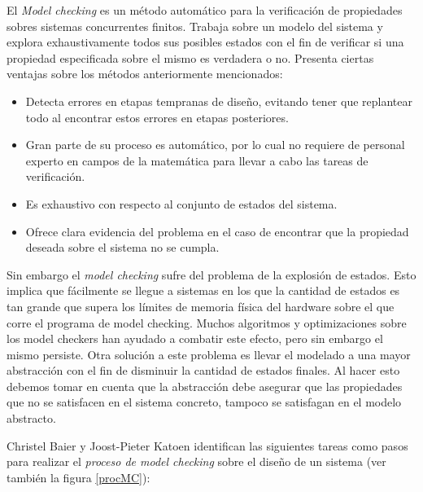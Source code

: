 \documentclass[titlepage, 12pt]{book}
\begin{document}
El \textit{Model checking} es un m\'etodo autom\'atico para la verificaci\'on de propiedades sobres sistemas concurrentes finitos. Trabaja sobre un modelo del sistema y explora exhaustivamente todos sus posibles estados con el fin de verificar si una propiedad especificada sobre el mismo es verdadera o no. Presenta ciertas ventajas sobre los m\'etodos anteriormente mencionados:

\begin{itemize}
\item Detecta errores en etapas tempranas de dise\~no, evitando tener que replantear todo al encontrar estos errores en etapas posteriores.

\item Gran parte de su proceso es autom\'atico, por lo cual no requiere de personal experto en campos de la matem\'atica para llevar a cabo las tareas de verificaci\'on.

\item Es exhaustivo con respecto al conjunto de estados del sistema.

\item Ofrece clara evidencia del problema en el caso de encontrar que la propiedad deseada sobre el sistema no se cumpla.
\end{itemize}

Sin embargo el \textit{model checking} sufre del problema de la explosi\'on de estados. Esto implica que f\'acilmente se llegue a sistemas en los que la cantidad de estados es tan grande que supera los l\'imites de memoria f\'isica del hardware sobre el que corre el programa de model checking. Muchos algoritmos y optimizaciones sobre los model checkers han ayudado a combatir este efecto, pero sin embargo el mismo persiste. Otra soluci\'on a este problema es llevar el modelado a una mayor abstracci\'on con el fin de disminuir la cantidad de estados finales. Al hacer esto debemos tomar en cuenta que la abstracci\'on debe asegurar que las propiedades que no se satisfacen en el sistema concreto, tampoco se satisfagan en el modelo abstracto.

Christel Baier y Joost-Pieter Katoen \cite{Baier} identifican las siguientes tareas como pasos para realizar el \textit{proceso de model checking} sobre el dise\~no de un sistema (ver tambi\'en la figura \ref{procMC}):
\end{document}
